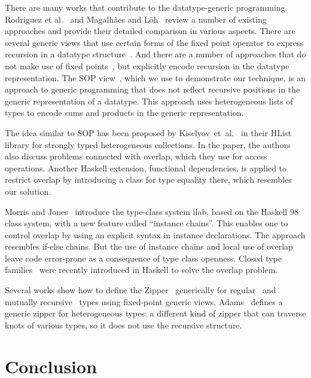 \documentclass[runningheads]{llncs}
\begin{document}
There are many works that contribute to the datatype-generic programming. Rodriguez et al.~\cite{Rodriguez2008} and Magalh{\~{a}}es and L{\"{o}}h~\cite{MagLoeh2012} review a number of existing approaches and provide their detailed comparison in various aspects. There are several generic views that use certain forms of the fixed point operator to express recursion in a datatype structure~\cite{VanNoort2008,MuRec2009,Jansson1997,Loeh2011}. And there are a number of approaches that do not make use of fixed points~\cite{Chakravarty2009,Magalhaes2010}, but explicitly encode recursion in the datatype representation. The SOP view~\cite{VriLoeh2014}, which we use to demonstrate our technique, is an approach to generic programming that does not reflect recursive positions in the generic representation of a datatype. This approach uses heterogeneous lists of types to encode sums and products in the generic representation.

The idea similar to SOP has been proposed by Kiselyov~et~al.~\cite{Kiselyov2004} in their \textsf{HList} library for strongly typed heterogeneous collections. In the paper, the authors also discuss problems connected with overlap, which they use for access operations. Another Haskell extension, functional dependencies, is applied to restrict overlap by introducing a class for type equality there, which resembles our solution.

Morris and Jones~\cite{Morris2010} introduce the type-class system \textsf{ilab}, based on the Haskell 98 class system, with a new feature called ``instance chains''. This enables one to control overlap by using an explicit syntax in instance declarations. The approach resembles if-else chains. But the use of instance chains and local use of overlap leave code error-prone as a consequence of type class openness. Closed type families~\cite{Eisenberg2014} were recently introduced in Haskell to solve the overlap problem.

Several works show how to define the Zipper~\cite{Huet1997} generically for regular~\cite{HiJeLo2004,McBride2001} and mutually recursive~\cite{MuRec2009} types using fixed-point generic views. Adams~\cite{Adams2010} defines a generic zipper for heterogeneous types: a different kind of zipper that can traverse knots of various types, so it does not use the recursive structure.



\section{Conclusion}
\label{sec:conclusion}
\end{document}
